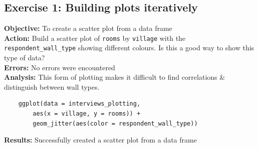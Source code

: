 \documentclass{article}
\begin{document}
\subsection{Exercise 1: Building plots iteratively}
\textbf{Objective:} To create a scatter plot from a data frame\\
\textbf{Action:} Build a scatter plot of \verb|rooms| by \verb|village| with the \\\verb|respondent_wall_type| showing different colours. Is this a good way to show this type of data?\\
\textbf{Errors:} No errors were encountered\\
\textbf{Analysis:} This form of plotting makes it difficult to find correlations \& distinguish between wall types.
\begin{verbatim}
    ggplot(data = interviews_plotting, 
        aes(x = village, y = rooms)) +
        geom_jitter(aes(color = respondent_wall_type))
\end{verbatim}
\textbf{Results:} Successfully created a scatter plot from a data frame
\end{document}
